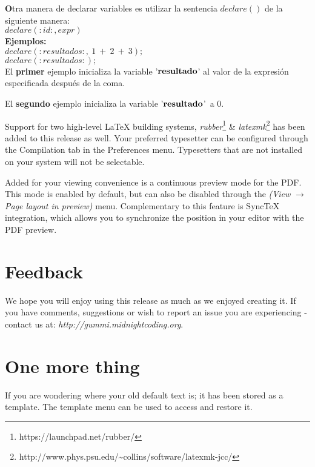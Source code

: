 \documentclass[11pt]{article}
\begin{document}
{\bf O}tra manera de declarar variables es utilizar la sentencia $declare()$ de la siguiente manera:\\
{\bf $declare(:id:, expr)$}\\

{\bf Ejemplos:}\\

{\bf $declare(:resultados:,\ 1\ +\ 2\ +\ 3);$}\\
{\bf $declare(:resultados:);$}\\

El {\bf primer} ejemplo inicializa la variable '${\bf resultado}$' al valor de la expresión especificada después de la coma.

El {\bf segundo} ejemplo inicializa la variable '${\bf resultado}$'\ a $0$.
\newpage


Support for two high-level {\LaTeX} building systems, \emph{rubber}\footnote{https://launchpad.net/rubber/} \& \emph{latexmk}\footnote{http://www.phys.psu.edu/{\textasciitilde}collins/software/latexmk-jcc/} has been added to this release as well. Your preferred typesetter can be configured through the Compilation tab in the Preferences menu. Typesetters that are not installed on your system will not be selectable. 

Added for your viewing convenience is a continuous preview mode for the PDF. This mode is enabled by default, but can also be disabled through the \emph{(View $\rightarrow$ Page layout in preview)} menu. Complementary to this feature is SyncTeX integration, which allows you to synchronize the position in your editor with the PDF preview. 

\section{Feedback}
We hope you will enjoy using this release as much as we enjoyed creating it. If you have comments, suggestions or wish to report an issue you are experiencing - contact us at: \emph{http://gummi.midnightcoding.org}.

\section{One more thing}
If you are wondering where your old default text is; it has been stored as a template. The template menu can be used to access and restore it. 
\end{document}
